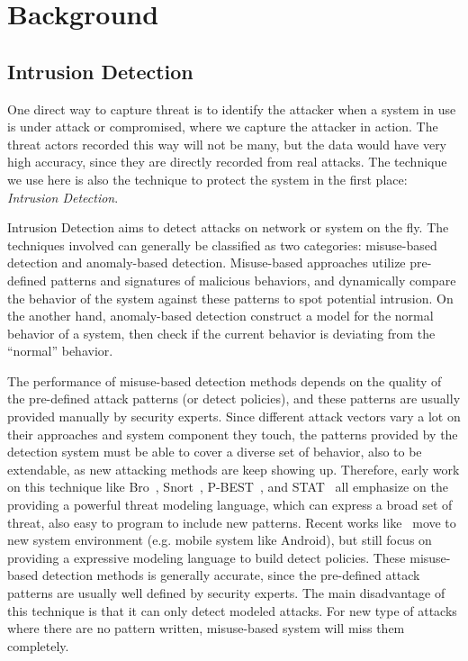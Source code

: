 \chapter{Background}
\label{chapter:background}

\section{Intrusion Detection}

One direct way to capture threat is to identify the attacker when a 
system in use is under attack or compromised, where we capture the 
attacker in action. The threat actors recorded this way will not be 
many, but the data would have very high accuracy, since they are
directly recorded from real attacks. The technique we use here is also 
the technique to protect the system in the first place:
\textit{Intrusion Detection}.

Intrusion Detection aims to detect attacks on network or system on the
fly. The techniques involved can generally be classified as two 
categories: misuse-based detection and anomaly-based detection.
Misuse-based approaches utilize pre-defined patterns and signatures
of malicious behaviors, and dynamically compare the behavior of the
system against these patterns to spot potential intrusion. On the another
hand, anomaly-based detection construct a model for the normal behavior 
of a system, then check if the current behavior is deviating from the 
``normal'' behavior.

The performance of misuse-based detection methods depends on the quality
of the pre-defined attack patterns (or detect policies), and these 
patterns are usually provided manually by security experts. Since 
different attack vectors vary a lot on their approaches and system 
component they touch, the 
patterns provided by the detection system must be able to cover a 
diverse set of behavior, also to be extendable, as new attacking
methods are keep showing up. Therefore, early work on this technique like
Bro~\cite{paxson1999bro}, Snort~\cite{roesch1999snort}, 
P-BEST~\cite{lindqvist1999detecting}, and STAT~\cite{vigna2003designing}
all emphasize on the providing a powerful threat modeling language, which
can express a broad set of threat, also easy to program to include new 
patterns. Recent works like~\cite{bugiel2012towards} move to new
system environment (e.g. mobile system like Android), but still focus
on providing a expressive modeling language to build detect policies. 
These misuse-based detection methods is generally accurate, since the
pre-defined attack patterns are usually well defined by security experts. 
The main disadvantage of this technique is that it can only detect 
modeled attacks. For new type of attacks where there are no pattern
written, misuse-based system will miss them completely.

